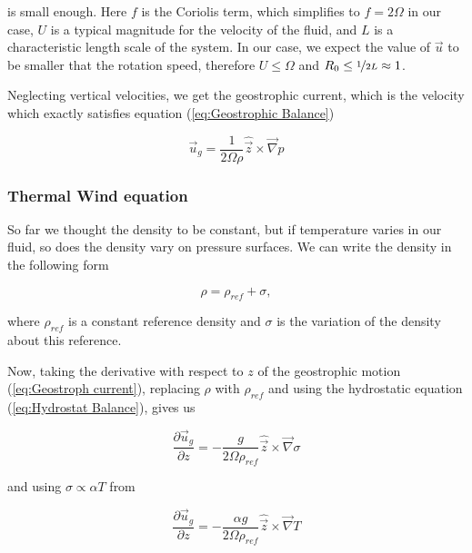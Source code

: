 \documentclass[12pt, a4paper, twoside]{article}
\begin{document}
		is small enough. Here $f$ is the Coriolis term, which simplifies to $f=2\Omega$ in our case, $U$ is a typical magnitude for the velocity of the fluid, and $L$ is a characteristic length scale of the system. In our case, we expect the value of $\vec{u}$ to be smaller that the rotation speed, therefore $U \leq \Omega$ and $R_0 \leq \nicefrac[]{1}{2 L} \approx 1$.
		
		Neglecting vertical velocities, we get the geostrophic current, which is the velocity which exactly satisfies equation (\ref{eq:Geostrophic Balance})
		
		\begin{equation}
			\vec{u}_g = \frac{1}{2\Omega \rho} \hat{\vec{z}} \times \vec{\nabla}p
			\label{eq:Geostroph current}
		\end{equation}
		
		\subsubsection{Thermal Wind equation}
			So far we thought the density to be constant, but if temperature varies in our fluid, so does the density vary on pressure surfaces. We can write the density in the following form
			
			\begin{equation}
				\rho = \rho_{ref} + \sigma ,
				\label{eq:Density}
			\end{equation} 
		
		where $\rho_{ref}$ is a constant reference density and $\sigma$ is the variation of the density about this reference. %
		
		Now, taking the derivative with respect to $z$ of the geostrophic motion (\ref{eq:Geostroph current}), replacing $\rho$ with $\rho_{ref}$ and using the hydrostatic equation (\ref{eq:Hydrostat Balance}), gives us
		
		\begin{equation}
			\frac{\partial \vec{u}_g}{\partial z} = - \frac{g}{2\Omega \rho_{ref}} \hat{\vec{z}} \times \vec{\nabla} \sigma
		\end{equation}
		
		and using $\sigma \propto \alpha T$ from %
		
		\begin{equation}
			\frac{\partial \vec{u}_g}{\partial z} = - \frac{\alpha g}{2\Omega \rho_{ref}} \hat{\vec{z}} \times \vec{\nabla} T
		\end{equation}
		
\end{document}
